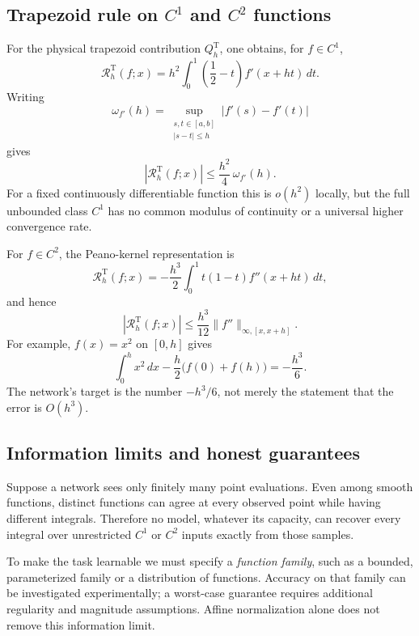 \subsection{Trapezoid rule on $C^1$ and $C^2$ functions}

For the physical trapezoid contribution $Q_h^{\mathrm T}$, one obtains,
for $f\in C^1$,
\begin{equation}
    \mathcal R_h^{\mathrm T}(f;x)
    =h^2\int_0^1\left(\frac12-t\right)f'(x+ht)\,dt.
    \label{eq:resop-trap-c1}
\end{equation}
Writing
\[
    \omega_{f'}(h)
    =\sup_{\substack{s,t\in[a,b]\\|s-t|\leq h}}
    |f'(s)-f'(t)|
\]
gives
\begin{equation}
    |\mathcal R_h^{\mathrm T}(f;x)|
    \leq \frac{h^2}{4}\,\omega_{f'}(h).
    \label{eq:resop-trap-modulus}
\end{equation}
For a fixed continuously differentiable function this is $o(h^2)$
locally, but the full unbounded class $C^1$ has no common modulus of
continuity or a universal higher convergence rate.

For $f\in C^2$, the Peano-kernel representation is
\begin{equation}
    \mathcal R_h^{\mathrm T}(f;x)
    =-\frac{h^3}{2}
    \int_0^1t(1-t)f''(x+ht)\,dt,
    \label{eq:resop-trap-c2}
\end{equation}
and hence
\begin{equation}
    |\mathcal R_h^{\mathrm T}(f;x)|
    \leq\frac{h^3}{12}\|f''\|_{\infty,[x,x+h]}.
    \label{eq:resop-trap-bound}
\end{equation}
For example, $f(x)=x^2$ on $[0,h]$ gives
\[
    \int_0^h x^2\,dx-\frac h2\bigl(f(0)+f(h)\bigr)
    =-\frac{h^3}{6}.
\]
The network's target is the number $-h^3/6$, not merely the statement
that the error is $O(h^3)$.

\subsection{Information limits and honest guarantees}

Suppose a network sees only finitely many point evaluations. Even among
smooth functions, distinct functions can agree at every observed point
while having different integrals. Therefore no model, whatever its
capacity, can recover every integral over unrestricted $C^1$ or $C^2$
inputs exactly from those samples.

To make the task learnable we must specify a \emph{function family},
such as a bounded, parameterized family or a distribution of functions.
Accuracy on that family can be investigated experimentally; a worst-case
guarantee requires additional regularity and magnitude assumptions.
Affine normalization alone does not remove this information limit.

